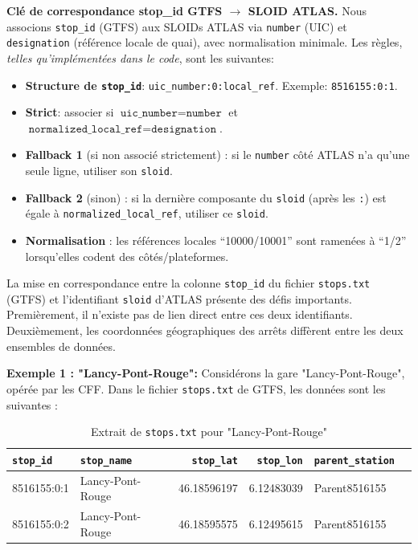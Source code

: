 \medskip
\noindent\textbf{Clé de correspondance stop\_id GTFS \(\to\) SLOID ATLAS.} Nous associons \texttt{stop\_id} (GTFS) aux SLOIDs ATLAS via \texttt{number} (UIC) et \texttt{designation} (référence locale de quai), avec normalisation minimale. Les règles, \emph{telles qu'implémentées dans le code}, sont les suivantes:
\begin{itemize}
  \item \textbf{Structure de \texttt{stop\_id}}: \texttt{uic\_number:0:local\_ref}. Exemple: \texttt{8516155:0:1}.
  \item \textbf{Strict}: associer si \(\texttt{uic\_number} = \texttt{number}\) et \(\texttt{normalized\_local\_ref} = \texttt{designation}\).
  \item \textbf{Fallback 1} (si non associé strictement) : si le \texttt{number} côté ATLAS n’a qu’une seule ligne, utiliser son \texttt{sloid}.
  \item \textbf{Fallback 2} (sinon) : si la dernière composante du \texttt{sloid} (après les \texttt{:}) est égale à \texttt{normalized\_local\_ref}, utiliser ce \texttt{sloid}.
  \item \textbf{Normalisation} : les références locales \enquote{10000/10001} sont ramenées à \enquote{1/2} lorsqu’elles codent des côtés/plateformes.
\end{itemize}

La mise en correspondance entre la colonne \texttt{stop\_id} du fichier \texttt{stops.txt} (GTFS) et l’identifiant \texttt{sloid} d’ATLAS présente des défis importants. Premièrement, il n’existe pas de lien direct entre ces deux identifiants. Deuxièmement, les coordonnées géographiques des arrêts diffèrent entre les deux ensembles de données.

\textbf{Exemple 1 : "Lancy-Pont-Rouge":}
\newline
Considérons la gare "Lancy-Pont-Rouge", opérée par les CFF. Dans le fichier \texttt{stops.txt} de GTFS, les données sont les suivantes :

\begin{table}[H]
\caption{Extrait de \texttt{stops.txt} pour "Lancy-Pont-Rouge"}
\label{tab:stops_lancy_2}
\centering
\begin{tabular}{l l r r l l}
\toprule
\texttt{stop\_id} & \texttt{stop\_name} & \texttt{stop\_lat} & \texttt{stop\_lon} & \texttt{parent\_station} \\
\midrule
8516155:0:1 & Lancy-Pont-Rouge & 46.18596197 & 6.12483039 & Parent8516155 \\
8516155:0:2 & Lancy-Pont-Rouge & 46.18595575 & 6.12495615 & Parent8516155 \\
\bottomrule
\end{tabular}
\end{table}

